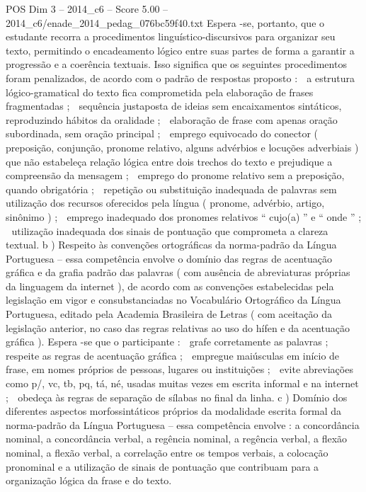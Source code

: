 \begin{textsample}{POS Dim 3 – 2014\_c6 – Score 5.00 – 2014\_c6/enade\_2014\_pedag\_076bc59f40.txt}
Espera -se, portanto, que o estudante recorra a procedimentos linguístico-discursivos para organizar seu texto, permitindo o encadeamento lógico entre suas partes de forma a garantir a progressão e a coerência textuais.
Isso significa que os seguintes procedimentos foram penalizados, de acordo com o padrão de respostas proposto :  a estrutura lógico-gramatical do texto fica comprometida pela elaboração de frases fragmentadas ;  sequência justaposta de ideias sem encaixamentos sintáticos, reproduzindo hábitos da oralidade ;  elaboração de frase com apenas oração subordinada, sem oração principal ;  emprego equivocado do conector ( preposição, conjunção, pronome relativo, alguns advérbios e locuções adverbiais ) que não estabeleça relação lógica entre dois trechos do texto e prejudique a compreensão da mensagem ;  emprego do pronome relativo sem a preposição, quando obrigatória ;  repetição ou substituição inadequada de palavras sem utilização dos recursos oferecidos pela língua ( pronome, advérbio, artigo, sinônimo ) ;  emprego inadequado dos pronomes relativos “ cujo(a) ” e “ onde ” ;  utilização inadequada dos sinais de pontuação que comprometa a clareza textual. b ) Respeito às convenções ortográficas da norma-padrão da Língua Portuguesa – essa competência envolve o domínio das regras de acentuação gráfica e da grafia padrão das palavras ( com ausência de abreviaturas próprias da linguagem da internet ), de acordo com as convenções estabelecidas pela legislação em vigor e consubstanciadas no Vocabulário Ortográfico da Língua Portuguesa, editado pela Academia Brasileira de Letras ( com aceitação da legislação anterior, no caso das regras relativas ao uso do hífen e da acentuação gráfica ).
Espera -se que o participante :  grafe corretamente as palavras ;  respeite as regras de acentuação gráfica ;  empregue maiúsculas em início de frase, em nomes próprios de pessoas, lugares ou instituições ;  evite abreviações como p/, vc, tb, pq, tá, né, usadas muitas vezes em escrita informal e na internet ;  obedeça às regras de separação de sílabas no final da linha. c ) Domínio dos diferentes aspectos morfossintáticos próprios da modalidade escrita formal da norma-padrão da Língua Portuguesa – essa competência envolve : a concordância nominal, a concordância verbal, a regência nominal, a regência verbal, a flexão nominal, a flexão verbal, a correlação entre os tempos verbais, a colocação pronominal e a utilização de sinais de pontuação que contribuam para a organização lógica da frase e do texto.

\end{textsample}
